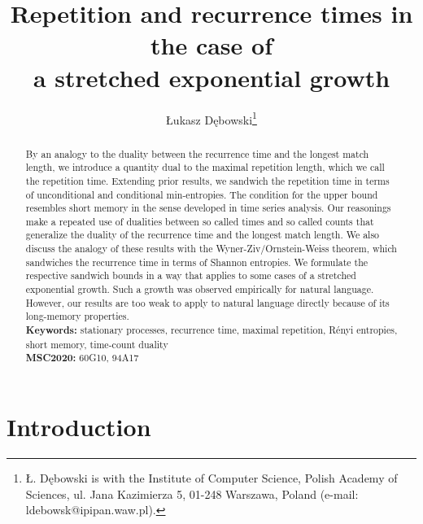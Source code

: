 \documentclass[a4paper,12pt]{article}
\author{{\L}ukasz D\k{e}bowski\thanks{
    {\L}. D\k{e}bowski is with
    the Institute of Computer Science, Polish Academy of Sciences, 
    ul. Jana Kazimierza 5, 01-248 Warszawa, Poland 
    (e-mail: ldebowsk@ipipan.waw.pl).
  }
}
\title{Repetition and recurrence times in the case of \\ a stretched
  exponential growth} \date{}
\begin{document}
\begin{titlepage}
\maketitle

\begin{abstract}
  By an analogy to the duality between the recurrence time and the
  longest match length, we introduce a quantity dual to the maximal
  repetition length, which we call the repetition time.  Extending
  prior results, we sandwich the repetition time in terms of
  unconditional and conditional min-entropies. The condition for the
  upper bound resembles short memory in the sense developed in time
  series analysis. Our reasonings make a repeated use of dualities
  between so called times and so called counts that generalize the
  duality of the recurrence time and the longest match length.  We
  also discuss the analogy of these results with the
  Wyner-Ziv/Ornstein-Weiss theorem, which sandwiches the recurrence
  time in terms of Shannon entropies. We formulate the respective
  sandwich bounds in a way that applies to some cases of a stretched
  exponential growth. Such a growth was observed empirically for
  natural language. However, our results are too weak to apply to
  natural language directly because of its long-memory properties.
%
  \\[1em]
  \textbf{Keywords:} stationary processes, recurrence time, maximal
  repetition, R\'enyi entropies, short memory, time-count duality
  \\[1em]
  \textbf{MSC2020:} 60G10, 94A17
\end{abstract}



\end{titlepage}


\section{Introduction}
\label{secIntroduction}
\end{document}

